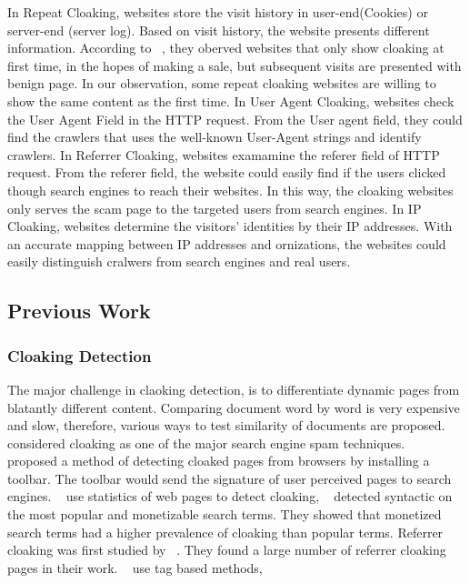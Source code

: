In Repeat Cloaking, websites store the visit history in user-end(Cookies) or server-end (server log). Based on visit history, the website presents different information. 
According to ~\cite{wang2011cloak}, they oberved websites that only show cloaking at first time, in the hopes of making a sale, but subsequent visits are presented 
with benign page. In our observation, some repeat cloaking websites are willing to 
show the same content as the first time. 
In User Agent Cloaking, websites check the User Agent Field in the HTTP request. From the User agent field, they could find the crawlers that uses the well-known User-Agent
strings and identify crawlers.
In Referrer Cloaking, websites examamine the referer field of HTTP request. From the referer field, the website could easily find if the users clicked though search engines to
reach their websites. In this way, the cloaking websites only serves the scam page to the targeted users from search engines. 
In IP Cloaking, websites determine the visitors' identities by their IP addresses. With an accurate mapping between IP addresses
and ornizations, the websites could easily distinguish cralwers from search engines and real users. 


\subsection{Previous Work}
\subsubsection{Cloaking Detection}
The major challenge in claoking detection, is to differentiate dynamic pages
from blatantly different content.
Comparing document word by word is very expensive and slow, therefore, 
various ways to test similarity of documents are proposed. 
~\cite{henzinger2002challenges}
 considered cloaking as one of the major search engine spam
techniques.
 ~\cite{najork2005system} proposed a method of detecting cloaked pages from browsers by
 installing a toolbar. The toolbar would send the signature of user perceived
 pages to search engines.
 ~\cite{wu2006detecting} use statistics of web pages to detect cloaking,
~\cite{chellapilla2006improving} detected syntactic on the most popular and
 monetizable search terms. They showed that monetized search terms had a higher
 prevalence of cloaking than popular terms.
 Referrer cloaking was first studied by ~\cite{wang2006detecting}. They found
 a large number of referrer cloaking pages in their work.
 ~\cite{lin2009detection} use tag based methods,

